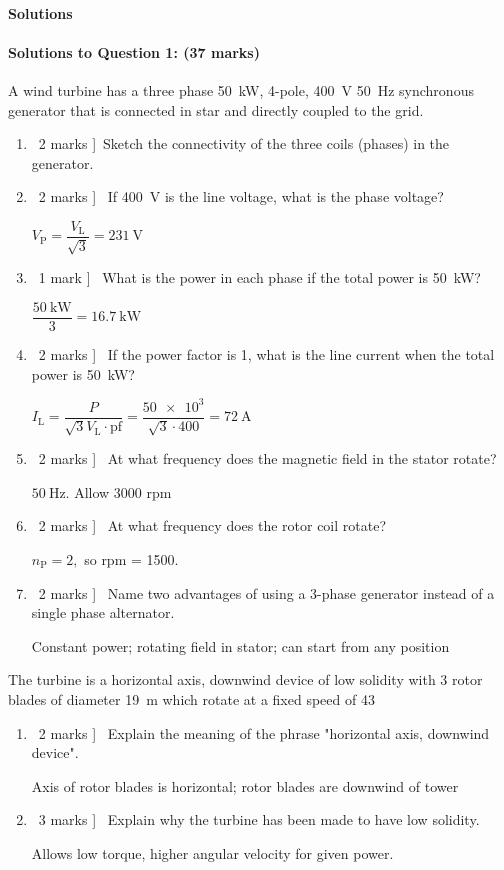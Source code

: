 \documentclass[a4paper,12pt,fleqn]{article}
\begin{document}
\label{finalpage}


\newpage
\paragraph{\textbf{Solutions} \ }
\paragraph{\textbf{Solutions to Question 1: (37 marks)}}
A wind turbine has a three phase \SI{50}{\kilo\watt}, 4-pole, \SI{400}{\volt} \SI{50}{\hertz} synchronous generator that is connected in star
 and directly coupled to the grid.
\begin{enumerate} [label=\alph*)]
\item \lbrack\ 2 marks ]\ Sketch the connectivity of the three coils (phases) in the generator.
\item \lbrack\ 2 marks ] \ If \SI{400}{\volt} is the line voltage, what is the phase voltage?\par
$V_\mathrm{P}=\dfrac{V_\mathrm{L}}{\sqrt{3}}=\SI{231}{\volt}$
\item \lbrack\ 1 mark ] \ What is the power in each phase if the total power is \SI{50}{\kilo\watt}?\par
$\dfrac{\SI{50}{\kilo\watt}}{3}=\SI{16.7}{\kilo\watt}$
\item \lbrack\ 2 marks ] \ If the power factor is 1, what is the line current when the total power is \SI{50}{\kilo\watt}?\par
$I_\mathrm{L}=\dfrac{P}{\sqrt{3}V_\mathrm{L}\cdot\mathrm{pf}}=\dfrac{\num{50e3}}{\sqrt{3}\cdot400}=\SI{72}{\ampere}$
\item \lbrack\ 2 marks ] \ At what frequency does the magnetic field in the stator rotate?\par
$\SI{50}{\hertz}$. Allow 3000 rpm
\item \lbrack\ 2 marks ] \ At what frequency does the rotor coil rotate?\par
$n_\mathrm{P}=2,$ so rpm = 1500.
\item \lbrack\ 2 marks ] \ Name two advantages of using a 3-phase generator instead of a single phase alternator.\par
Constant power; rotating field in stator; can start from any position
\end{enumerate}
The turbine is a horizontal axis, downwind device of low solidity with 3 rotor blades of diameter \SI{19}{\metre} which rotate at a fixed speed
 of \SI{43}{\rpm}
\begin{enumerate} [resume,label=\alph*)]
\item \lbrack\ 2 marks ] \ Explain the meaning of the phrase "horizontal axis, downwind device".\par
Axis of rotor blades is horizontal; rotor blades are downwind of tower
\item \lbrack\ 3 marks ] \ Explain why the turbine has been made to have low solidity.\par
Allows low torque, higher angular velocity for given power.
\end{enumerate}
\end{document}
